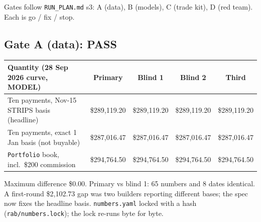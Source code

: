 \small
Gates follow \texttt{RUN\_PLAN.md} s3: A (data), B (models), C (trade kit), D (red team). Each is go / fix / stop.

\subsection*{Gate A (data): PASS}
\begin{center}
\begin{tabular}{lcccc}
\toprule
Quantity (28 Sep 2026 curve, MODEL) & Primary & Blind 1 & Blind 2 & Third \\
\midrule
Ten payments, Nov-15 STRIPS basis (headline) & \$289,119.20 & \$289,119.20 & \$289,119.20 & \$289,119.20 \\
Ten payments, exact 1 Jan basis (not buyable) & \$287,016.47 & \$287,016.47 & \$287,016.47 & \$287,016.47 \\
\texttt{Portfolio} book, incl.\ \$200 commission & \$294,764.50 & \$294,764.50 & \$294,764.50 & \$294,764.50 \\
\bottomrule
\end{tabular}
\end{center}
Maximum difference \$0.00. Primary vs blind 1: 65 numbers and 8 dates identical. A first-round \$2,102.73 gap was two
builders reporting different bases; the spec now fixes the headline basis. \texttt{numbers.yaml} locked with a hash
(\texttt{rab/numbers.lock}); the lock re-runs byte for byte.

